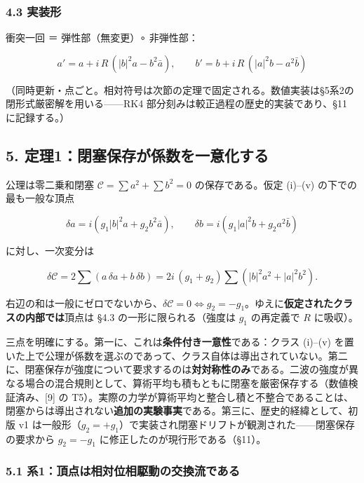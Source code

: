 \documentclass[
  a4paper,
]{ltjsarticle}
\begin{document}
\subsubsection{4.3 実装形}\label{ux5b9fux88c5ux5f62}

衝突一回 ＝ 弾性部（無変更）∘ 非弾性部：

\[a' = a + i\,R\,(|b|^2 a - b^2 \bar a), \qquad b' = b + i\,R\,(|a|^2 b - a^2 \bar b)\]

（同時更新・点ごと。相対符号は次節の定理で固定される。数値実装は§5系2の閉形式厳密解を用いる------RK4
部分刻みは較正過程の歴史的実装であり、§11 に記録する。）

\subsection{5.
定理1：閉塞保存が係数を一意化する}\label{ux5b9aux74061ux9589ux585eux4fddux5b58ux304cux4fc2ux6570ux3092ux4e00ux610fux5316ux3059ux308b}

公理は零二乗和閉塞 \(\mathcal{C} = \sum a^2 + \sum b^2 = 0\)
の保存である。仮定 (i)--(v) の下での最も一般な頂点

\[\delta a = i(g_1 |b|^2 a + g_2 b^2 \bar a), \qquad \delta b = i(g_1 |a|^2 b + g_2 a^2 \bar b)\]

に対し、一次変分は

\[\delta \mathcal{C} = 2\sum (a\,\delta a + b\,\delta b) = 2i\,(g_1+g_2)\sum\left(|b|^2 a^2 + |a|^2 b^2\right).\]

右辺の和は一般にゼロでないから、\(\delta\mathcal{C}=0 \iff g_2 = -g_1\)。ゆえに\textbf{仮定されたクラスの内部では}頂点は
§4.3 の一形に限られる（強度は \(g_1\) の再定義で \(R\) に吸収）。

三点を明確にする。第一に、これは\textbf{条件付き一意性}である：クラス
(i)--(v)
を置いた上で公理が係数を選ぶのであって、クラス自体は導出されていない。第二に、閉塞保存が強度について要求するのは\textbf{対対称性のみ}である。二波の強度が異なる場合の混合規則として、算術平均も積もともに閉塞を厳密保存する（数値検証済み、{[}9{]}
の
T5）。実際の力学が算術平均と整合し積と不整合であることは、閉塞からは導出されない\textbf{追加の実験事実}である。第三に、歴史的経緯として、初版
v1
は一般形（\(g_2=+g_1\)）で実装され閉塞ドリフトが観測された------閉塞保存の要求から
\(g_2=-g_1\) に修正したのが現行形である（§11）。

\subsubsection{5.1
系1：頂点は相対位相駆動の交換流である}\label{ux7cfb1ux9802ux70b9ux306fux76f8ux5bfeux4f4dux76f8ux99c6ux52d5ux306eux4ea4ux63dbux6d41ux3067ux3042ux308b}
\end{document}
